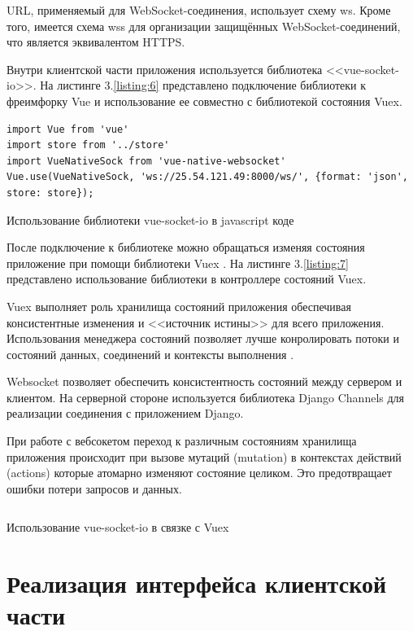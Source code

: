URL, применяемый для WebSocket-соединения, использует схему ws. Кроме того, имеется схема wss для организации защищённых WebSocket-соединений, что является эквивалентом HTTPS.

Внутри клиентской части приложения используется библиотека <<vue-socket-io>>. На листинге 3.\ref{listing:6} представлено подключение библиотеки к фреимфорку Vue и использование ее совместно с библиотекой состояния Vuex.

\begin{listing}[H]
\begin{verbatim}
import Vue from 'vue'
import store from '../store'
import VueNativeSock from 'vue-native-websocket'
Vue.use(VueNativeSock, 'ws://25.54.121.49:8000/ws/', {format: 'json', store: store});
\end{verbatim}
\caption{Использование библиотеки vue-socket-io в javascript коде}
\label{listing:6}
\end{listing}

После подключение к библиотеке можно обращаться изменяя состояния приложение при помощи библиотеки Vuex \cite{halliday2018vue}. На листинге 3.\ref{listing:7} представлено использование библиотеки в контроллере состояний Vuex. 

Vuex выполняет роль хранилища состояний приложения обеспечивая консистентные изменения и <<источник истины>> для всего приложения. Использования менеджера состояний позволяет лучше конролировать потоки и состояний данных, соединений и контексты выполнения \cite{halliday2018vue}.

Websocket позволяет обеспечить консистентность состояний между сервером и клиентом. На серверной стороне используется библиотека Django Channels для реализации соединения с приложением Django.

При работе с вебсокетом переход к различным состояниям хранилища приложения происходит при вызове мутаций (mutation) в контекстах действий (actions) которые атомарно изменяют состояние целиком. Это предотвращает ошибки потери запросов и данных.  

\begin{listing}[H]
   \inputminted[breaklines, breakanywhere, linenos, fontsize=\small]{javascript}{source/vue-socket.js}
\caption{Использование vue-socket-io в связке с Vuex}
\label{listing:7}
\end{listing}


\section{Реализация интерфейса клиентской части}

